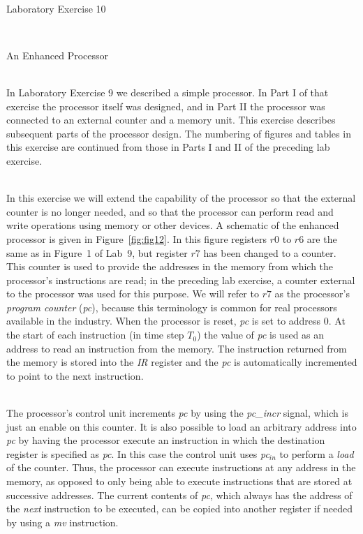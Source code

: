 \documentclass[epsfig,10pt,fullpage]{article} \addtolength{\textwidth}{1.5in}
\begin{document}
~\\
\centerline{\huge Laboratory Exercise 10}
~\\
\centerline{\large An Enhanced Processor}
~\\
In Laboratory Exercise 9 we described a simple processor. In
Part I of that exercise the processor itself was designed, and in Part II the processor was
connected to an external counter and a memory unit. This exercise describes subsequent
parts of the processor design. The numbering of figures and tables in this exercise 
are continued from those in Parts I and II of the preceding lab exercise.

~\\
\noindent
In this exercise we will extend the capability of the processor so that the external counter 
is no longer needed, and so that the processor can perform read and
write operations using memory or other devices. 
A schematic of the enhanced processor is given in
Figure~\ref{fig:fig12}. In this figure
registers $r0$ to $r6$ are the same as in Figure~1 of Lab~9, but register $r7$ has 
been changed to a counter. This counter is used to provide the addresses in the memory from 
which the processor's instructions are read; in the preceding 
lab exercise, a counter external to the processor was used for this purpose. 
We will refer to $r7$ as the processor's {\it program counter} ({\it pc}), because this 
terminology is common for real processors available in the industry. When the processor is 
reset, {\it pc} is set to address 0. At the start of each instruction (in time step $T_0$) the 
value of {\it pc} is used as an address to read an instruction from the memory. The instruction
returned from the memory is stored into the {\it IR} register and the {\it pc} is automatically
incremented to point to the next instruction.

~\\
\noindent
The processor's control unit increments {\it pc} by using the {\it pc\_incr} signal, which is
just an enable on this counter. It is also possible to load an arbitrary address into 
{\it pc} by having the processor execute an instruction in which the destination register is 
specified as {\it pc}. In this case the control unit uses
{\it pc}$_{in}$ to perform 
a {\it load} of the counter. Thus, the processor can execute instructions at any address 
in the memory, as opposed to only being able to execute instructions that are stored at 
successive addresses. The current contents of {\it pc},
which always has the address of 
the {\it next} instruction to be executed, can be copied into another register if needed 
by using a {\it mv} instruction. 
\end{document}
